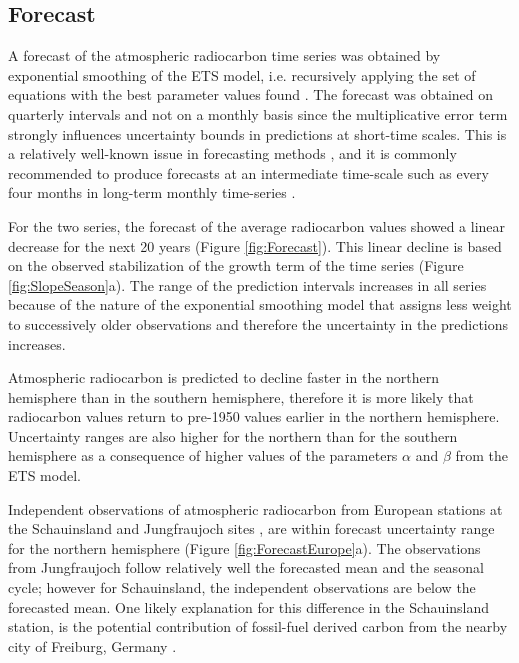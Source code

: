 %
\subsection{Forecast}
A forecast of the atmospheric radiocarbon time series was obtained by exponential smoothing of the ETS model, i.e. recursively applying the set of equations with the best parameter values found \citep{Hyndman2008}. The forecast was obtained on quarterly intervals and not on a monthly basis since the multiplicative error term strongly influences uncertainty bounds in predictions at short-time scales. This is a relatively well-known issue in forecasting methods \citep{Athanasopoulos}, and it is commonly recommended to produce forecasts at an intermediate time-scale such as every four months in long-term monthly time-series \citep{Nijman1990, Rossana1995, Athanasopoulos}. 

For the two series, the forecast of the average radiocarbon values showed a linear decrease for the next 20 years (Figure \ref{fig:Forecast}). This linear decline is based on the observed stabilization of the growth term of the time series (Figure \ref{fig:SlopeSeason}a). The range of the prediction intervals increases in all series because of the nature of the exponential smoothing model that assigns less weight to successively older observations and therefore the uncertainty in the predictions increases. 

Atmospheric radiocarbon is predicted to decline faster in the northern hemisphere than in the southern hemisphere, therefore it is more likely that radiocarbon values return to pre-1950 values earlier in the northern hemisphere. Uncertainty ranges are also higher for the northern than for the southern hemisphere as a consequence of higher values of the parameters $\alpha$ and $\beta$ from the ETS model.

Independent observations of atmospheric radiocarbon from European stations at the Schauinsland and Jungfraujoch sites \citep{Levin2013Tellus}, are within forecast uncertainty range for the northern hemisphere (Figure \ref{fig:ForecastEurope}a). The observations from Jungfraujoch follow relatively well the forecasted mean and the seasonal cycle; however for Schauinsland, the independent observations are below the forecasted mean. 
One likely explanation for this difference in the Schauinsland station, is the potential contribution of fossil-fuel derived carbon from the nearby city of Freiburg, Germany \citep{Levin1989Radiocarbon, Turnbull2009JGR, Levin2013Tellus}.

